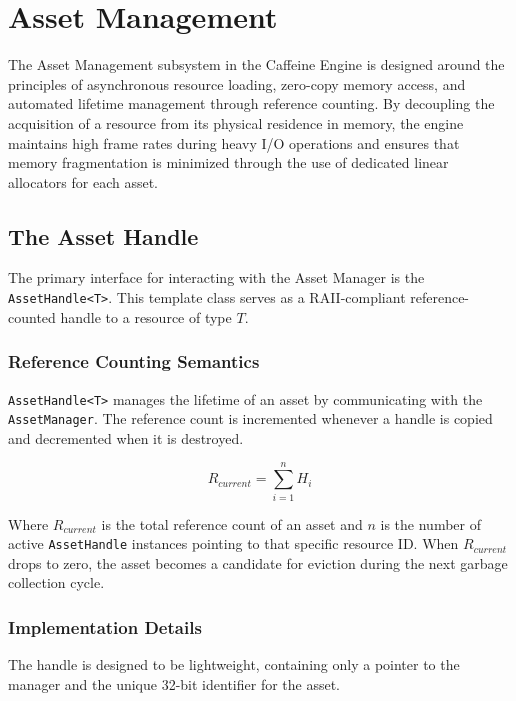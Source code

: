\chapter{Asset Management}

The Asset Management subsystem in the Caffeine Engine is designed around the principles of asynchronous resource loading, zero-copy memory access, and automated lifetime management through reference counting. By decoupling the acquisition of a resource from its physical residence in memory, the engine maintains high frame rates during heavy I/O operations and ensures that memory fragmentation is minimized through the use of dedicated linear allocators for each asset.

\section{The Asset Handle}

The primary interface for interacting with the Asset Manager is the \texttt{AssetHandle<T>}. This template class serves as a RAII-compliant reference-counted handle to a resource of type $T$.

\subsection{Reference Counting Semantics}

\texttt{AssetHandle<T>} manages the lifetime of an asset by communicating with the \texttt{AssetManager}. The reference count is incremented whenever a handle is copied and decremented when it is destroyed.

\begin{equation}
    R_{current} = \sum_{i=1}^{n} H_i
\end{equation}

Where $R_{current}$ is the total reference count of an asset and $n$ is the number of active \texttt{AssetHandle} instances pointing to that specific resource ID. When $R_{current}$ drops to zero, the asset becomes a candidate for eviction during the next garbage collection cycle.

\subsection{Implementation Details}

The handle is designed to be lightweight, containing only a pointer to the manager and the unique 32-bit identifier for the asset.

